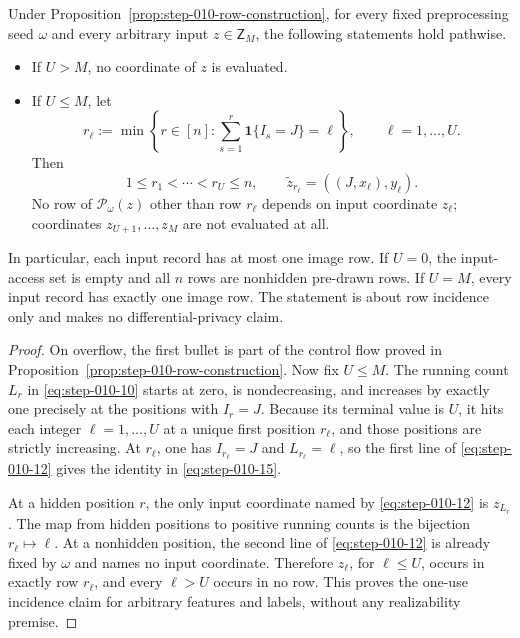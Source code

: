 \begin{lemma}\label{lem:step-010-one-use}
Under Proposition~\ref{prop:step-010-row-construction}, for every fixed
preprocessing seed \(\omega\) and every arbitrary input
\(z\in\mathsf Z_M\), the following statements hold pathwise.

\begin{itemize}
\item If \(U>M\), no coordinate of \(z\) is evaluated.
\item If \(U\le M\), let
  \[
    r_\ell:=\min\left\{r\in[n]:
      \sum_{s=1}^r\mathbf1\{I_s=J\}=\ell\right\},
    \qquad \ell=1,\ldots,U.
  \tag{S10.14}\label{eq:step-010-14}
  \]
  Then
  \[
    1\le r_1<\cdots<r_U\le n,
    \qquad
    \widetilde z_{r_\ell}=((J,x_\ell),y_\ell).
  \tag{S10.15}\label{eq:step-010-15}
  \]
  No row of \(\mathcal P_\omega(z)\) other than row \(r_\ell\) depends on
  input coordinate \(z_\ell\); coordinates \(z_{U+1},\ldots,z_M\) are not
  evaluated at all.
\end{itemize}

In particular, each input record has at most one image row. If \(U=0\), the
input-access set is empty and all \(n\) rows are nonhidden pre-drawn rows.
If \(U=M\), every input record has exactly one image row. The statement is
about row incidence only and makes no differential-privacy claim.
\end{lemma}

\begin{proof}
On overflow, the first bullet is part of the control flow proved in
Proposition~\ref{prop:step-010-row-construction}. Now fix \(U\le M\). The
running count \(L_r\) in \eqref{eq:step-010-10} starts at zero, is nondecreasing, and
increases by exactly one precisely at the positions with \(I_r=J\).
Because its terminal value is \(U\), it hits each integer
\(\ell=1,\ldots,U\) at a unique first position \(r_\ell\), and those
positions are strictly increasing. At \(r_\ell\), one has
\(I_{r_\ell}=J\) and \(L_{r_\ell}=\ell\), so the first line of \eqref{eq:step-010-12} gives
the identity in \eqref{eq:step-010-15}.

At a hidden position \(r\), the only input coordinate named by \eqref{eq:step-010-12} is
\(z_{L_r}\). The map from hidden positions to positive running counts is
the bijection \(r_\ell\mapsto\ell\). At a nonhidden position, the second
line of \eqref{eq:step-010-12} is already fixed by \(\omega\) and names no input coordinate.
Therefore \(z_\ell\), for \(\ell\le U\), occurs in exactly row \(r_\ell\),
and every \(\ell>U\) occurs in no row. This proves the one-use incidence
claim for arbitrary features and labels, without any realizability premise.
\end{proof}

